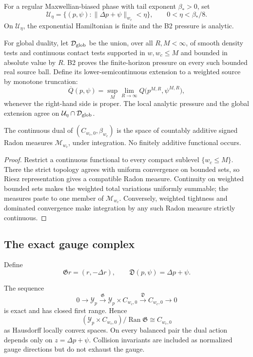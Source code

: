 For a regular Maxwellian-biased phase with tail exponent \(\beta_*>0\), set
\[
\mathcal U_\eta=
\{(p,\psi):\|\Delta p+\psi\|_{w_c}<\eta\},
\qquad 0<\eta<\beta_*/8.
\]
On \(\mathcal U_\eta\), the exponential Hamiltonian is finite and the B2
pressure is analytic.

For global duality, let \(\mathcal D_{\rm glob}\) be the union, over all
\(R,M<\infty\), of smooth density tests and continuous contact tests supported
in \(w,w_c\le M\) and bounded in absolute value by \(R\).  B2 proves the
finite-horizon pressure on every such bounded real source ball.  Define its
lower-semicontinuous extension to a weighted source by monotone truncation:
\[
\overline Q(p,\psi)=
\sup_{M}\lim_{R\to\infty}
Q\bigl(p^{M,R},\psi^{M,R}\bigr),
\]
whenever the right-hand side is proper.  The local analytic pressure and the
global extension agree on \(\mathcal U_\eta\cap\mathcal D_{\rm glob}\).

\begin{lemma}
\label{lem:r6-b3-radon}
The continuous dual of
\((C_{w_c,0},\beta_{w_c})\) is the space of countably additive signed Radon
measures \(\mathcal M_{w_c}\), under integration.  No finitely additive
functional occurs.
\end{lemma}

\begin{proof}
Restrict a continuous functional to every compact sublevel
\(\{w_c\le M\}\).  There the strict topology agrees with uniform convergence
on bounded sets, so Riesz representation gives a compatible Radon measure.
Continuity on weighted bounded sets makes the weighted total variations
uniformly summable; the measures paste to one member of
\(\mathcal M_{w_c}\).  Conversely, weighted tightness and dominated
convergence make integration by any such Radon measure strictly continuous.
\end{proof}

\subsection{The exact gauge complex}

Define
\[
\mathfrak G r=(r,-\Delta r),
\qquad
\mathfrak D(p,\psi)=\Delta p+\psi.
\]

\begin{theorem}
\label{thm:r6-b3-gauge}
The sequence
\[
0\longrightarrow\mathcal Y_p
\xrightarrow{\mathfrak G}
\mathcal Y_p\times C_{w_c,0}
\xrightarrow{\mathfrak D}
C_{w_c,0}\longrightarrow0
\]
is exact and has closed first range.  Hence
\[
(\mathcal Y_p\times C_{w_c,0})/
\operatorname{Ran}\mathfrak G
\cong C_{w_c,0}
\]
as Hausdorff locally convex spaces.  On every balanced pair the dual action
depends only on \(z=\Delta p+\psi\).  Collision invariants are included as
normalized gauge directions but do not exhaust the gauge.
\end{theorem}

